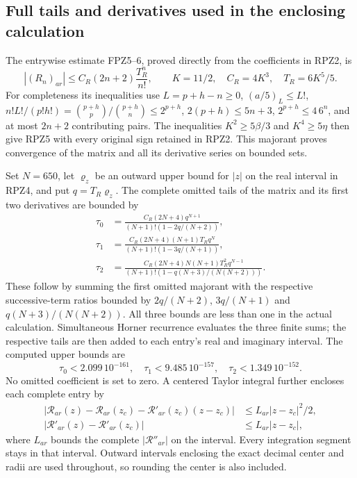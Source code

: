 \documentclass[11pt]{article}
\begin{document}
\subsection{Full tails and derivatives used in the enclosing calculation}
The entrywise estimate FPZ5--6, proved directly from the coefficients
in RPZ2, is
\[
 |(R_n)_{ar}|\le C_R(2n+2)\frac{T_R^n}{n!},\qquad
 K=11/2,\quad C_R=4K^3,\quad T_R=6K^5/5 .\tag{RPZ5}
\]
For completeness its inequalities use $L=p+h-n\ge0$,
$(a/5)_L\le L!$,
$n!L!/(p!h!)=\binom{p+h}{p}/\binom{p+h}{n}\le2^{p+h}$,
$2(p+h)\le5n+3$, $2^{p+h}\le4\,6^n$, and at most $2n+2$
contributing pairs. The inequalities $K^2\ge5\beta/3$ and
$K^4\ge5\eta$ then give RPZ5 with every original sign retained
in RPZ2. This majorant proves convergence of the matrix and all
its derivative series on bounded sets.

Set $N=650$, let $\varrho_z$ be an outward upper bound for $|z|$ on the
real interval in RPZ4, and put $q=T_R\varrho_z$. The complete omitted
tails of the matrix and its first two derivatives are bounded by
\[
 \begin{aligned}
 \tau_0&=\frac{C_R(2N+4)q^{N+1}}{(N+1)!(1-2q/(N+2))},\\
 \tau_1&=\frac{C_R(2N+4)(N+1)T_Rq^N}{(N+1)!(1-3q/(N+1))},\\
 \tau_2&=\frac{C_R(2N+4)N(N+1)T_R^2q^{N-1}}
 {(N+1)!(1-q(N+3)/(N(N+2)))} .
 \end{aligned}\tag{RPZ6}
\]
These follow by summing the first omitted majorant with the
respective successive-term ratios bounded by
$2q/(N+2)$, $3q/(N+1)$ and $q(N+3)/(N(N+2))$.
All three bounds are less than one in the actual calculation.
Simultaneous Horner recurrence evaluates the three finite sums;
the respective tails are then added to each entry's real and
imaginary interval. The computed upper bounds are
\[
 \tau_0<2.099\,10^{-161},\quad
 \tau_1<9.485\,10^{-157},\quad
 \tau_2<1.349\,10^{-152}.\tag{RPZ7}
\]
No omitted coefficient is set to zero. A centered Taylor integral
further encloses each complete entry by
\[
 \begin{aligned}
 |\mathcal R_{ar}(z)-\mathcal R_{ar}(z_c)
              -\mathcal R'_{ar}(z_c)(z-z_c)|&\le L_{ar}|z-z_c|^2/2,\\
 |\mathcal R'_{ar}(z)-\mathcal R'_{ar}(z_c)|&\le L_{ar}|z-z_c|,
 \end{aligned}\tag{RPZ8}
\]
where $L_{ar}$ bounds the complete $|\mathcal R''_{ar}|$ on the
interval. Every integration segment stays in that interval.
Outward intervals enclosing the exact decimal center and radii
are used throughout, so rounding the center is also included.
\end{document}
